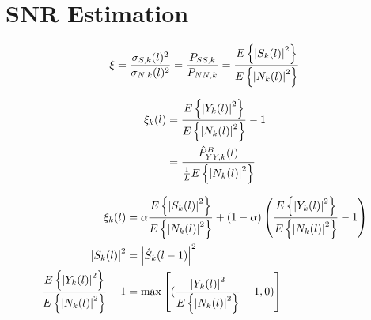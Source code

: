 \section{SNR Estimation} \label{sec:snr_estimation}

\begin{equation}
  \xi = \frac{\sigma_{S,k}(l)^{2}}{\sigma_{N,k}(l)^{2}} =
  \frac{P_{SS,k}}{P_{NN,k}} =
  \frac{E\left\{\abs{S_{k}(l)}^{2}\right\}}{E\left\{\abs{N_{k}(l)}^{2}\right\}}
  \label{eq:SNR}
\end{equation}

\begin{align}
  \xi_{k}(l) &= \frac{E\left\{\abs{Y_{k}(l)}^{2}\right\}}{E\left\{\abs{N_{k}(l)}^{2}\right\}} - 1
  \label{eq:ML1}\\
  &= \frac{\hat P_{YY,k}^{B}(l)}{\frac{1}{L}E\left\{\abs{N_{k}(l)}^{2}\right\}}
  \label{eq:M2}
\end{align}

\begin{align}
  \xi_{k}(l) &= \alpha \frac{E\left\{\abs{S_{k}(l)}^{2}\right\}}{E\left\{\abs{N_{k}(l)}^{2}\right\}} +
  (1-\alpha)\left(\frac{E\left\{\abs{Y_{k}(l)}^{2}\right\}}{E\left\{\abs{N_{k}(l)}^{2}\right\}} - 1\right)
  \label{eq:dd1}\\
  \abs{S_{k}(l)}^{2} &= \abs{\hat S_{k}(l-1)}^{2}
  \label{eq:dd2} \\
  \frac{E\left\{\abs{Y_{k}(l)}^{2}\right\}}{E\left\{\abs{N_{k}(l)}^{2}\right\}} - 1 &=
  \max \left[(\frac{\abs{Y_{k}(l)}^{2}}{E\left\{\abs{N_{k}(l)}^{2}\right\}}-1,0)\right]
\end{align}
